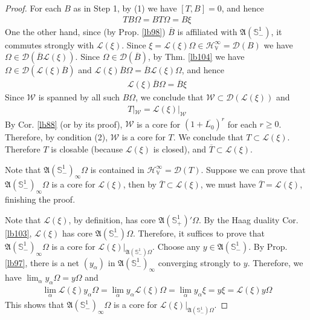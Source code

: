 \documentclass[12pt,b5paper,notitlepage]{article}
\theoremstyle{definition}
\theoremstyle{plain}
\newcommand{\fk}{\mathfrak}
\newcommand{\mc}{\mathcal}
\newcommand{\ovl}{\overline}
\newcommand{\Dom}{\scr{D}}
\newcommand{\scr}{\mathscr}
\newcommand{\Sbb}{{\mathbb S}}
\newcommand{\HV}{\mathcal H_{\mathbb V}}
\numberwithin{equation}{section}
\begin{document}
\begin{proof}
For each $B$ as in Step 1, by (1) we have $[T,B]=0$, and hence
\begin{align*}
TB\Omega=BT\Omega=B\xi
\end{align*}
One the other hand, since (by Prop. \ref{lb98}) $\ovl B$ is affiliated with $\fk A(\Sbb^1_-)$, it commutes strongly with $\scr L(\xi)$. Since $\xi=\scr L(\xi)\Omega\in\HV^\infty=\Dom(B)$ we have $\Omega\in\Dom(\ovl B\scr L(\xi))$. Since $\Omega\in\Dom(\ovl B)$, by Thm. \ref{lb104} we have $\Omega\in\Dom(\scr L(\xi)\ovl B)$ and $\scr L(\xi)\ovl B\Omega=\ovl B\scr L(\xi)\Omega$, and hence 
\begin{align*}
\scr L(\xi)\ovl B\Omega=\ovl B\xi
\end{align*}
Since $\mc W$ is spanned by all such $B\Omega$, we conclude that $\mc W\subset\Dom(\scr L(\xi))$ and
\begin{align*}
T|_{\mc W}=\scr L(\xi)|_{\mc W}
\end{align*}
By Cor. \ref{lb88} (or by its proof), $\mc W$ is a core for $(1+\ovl{L_0})^r$ for each $r\geq0$. Therefore, by condition (2), $\mc W$ is a core for $T$. We conclude that $T\subset \scr L(\xi)$. Therefore $T$ is closable (because $\scr L(\xi)$ is closed), and $\ovl T\subset\scr L(\xi)$.




Note that $\fk A(\Sbb^1_-)_\infty\Omega$ is contained in $\HV^\infty=\Dom(T)$. Suppose we can prove that $\fk A(\Sbb^1_-)_\infty\Omega$ is a core for $\scr L(\xi)$, then by $\ovl T\subset\scr L(\xi)$, we must have $\ovl T=\scr L(\xi)$, finishing the proof.

Note that $\scr L(\xi)$, by definition, has core $\fk A(\Sbb^1_+)'\Omega$. By the Haag duality Cor. \ref{lb103}, $\scr L(\xi)$ has core $\fk A(\Sbb^1_-)\Omega$. Therefore, it suffices to prove that $\fk A(\Sbb^1_-)_\infty\Omega$ is a core for $\scr L(\xi)\big|_{\fk A(\Sbb^1_-)\Omega}$. Choose any $y\in\fk A(\Sbb^1_-)$. By Prop. \ref{lb97}, there is a net $(y_\alpha)$ in $\fk A(\Sbb^1_-)_\infty$ converging strongly to $y$. Therefore, we have $\lim_\alpha y_\alpha\Omega=y\Omega$ and
\begin{align*}
\lim_\alpha\scr L(\xi)y_\alpha\Omega=\lim_\alpha y_\alpha \scr L(\xi)\Omega=\lim_\alpha y_\alpha\xi=y\xi=\scr L(\xi)y\Omega
\end{align*}
This shows that $\fk A(\Sbb^1_-)_\infty\Omega$ is a core for $\scr L(\xi)|_{\fk A(\Sbb^1_-)\Omega}$.
\end{proof}


\subsection{}
\end{document}
